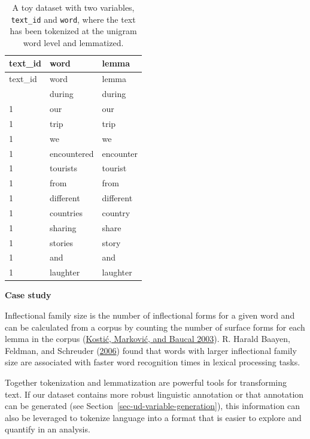 \documentclass[
  letterpaper,
  DIV=11,
  numbers=noendperiod]{scrreport}
\theoremstyle{definition}
\theoremstyle{remark}
\begin{document}
\hypertarget{tbl-ud-text-dataset-lemmatization}{}
\begin{longtable}[]{@{}lll@{}}
\caption{\label{tbl-ud-text-dataset-lemmatization}A toy dataset with two
variables, \texttt{text\_id} and \texttt{word}, where the text has been
tokenized at the unigram word level and lemmatized.}\tabularnewline
\toprule\noalign{}
text\_id & word & lemma \\
\midrule\noalign{}
\endfirsthead
\toprule\noalign{}
text\_id & word & lemma \\
\midrule\noalign{}
\endhead
\bottomrule\noalign{}
\endlastfoot
1 & during & during \\
1 & our & our \\
1 & trip & trip \\
1 & we & we \\
1 & encountered & encounter \\
1 & tourists & tourist \\
1 & from & from \\
1 & different & different \\
1 & countries & country \\
1 & sharing & share \\
1 & stories & story \\
1 & and & and \\
1 & laughter & laughter \\
\end{longtable}

\begin{tcolorbox}[enhanced jigsaw, opacityback=0, bottomrule=.15mm, left=2mm, breakable, colback=white, leftrule=.75mm, toprule=.15mm, rightrule=.15mm, arc=.35mm]

\textbf{ Case study}

Inflectional family size is the number of inflectional forms for a given
word and can be calculated from a corpus by counting the number of
surface forms for each lemma in the corpus
(\protect\hyperlink{ref-Kostic2003}{Kostić, Marković, and Baucal 2003}).
R. Harald Baayen, Feldman, and Schreuder
(\protect\hyperlink{ref-Baayen2006}{2006}) found that words with larger
inflectional family size are associated with faster word recognition
times in lexical processing tasks.

\end{tcolorbox}

Together tokenization and lemmatization are powerful tools for
transforming text. If our dataset contains more robust linguistic
annotation or that annotation can be generated (see
Section~\ref{sec-ud-variable-generation}), this information can also be
leveraged to tokenize language into a format that is easier to explore
and quantify in an analysis.
\end{document}
